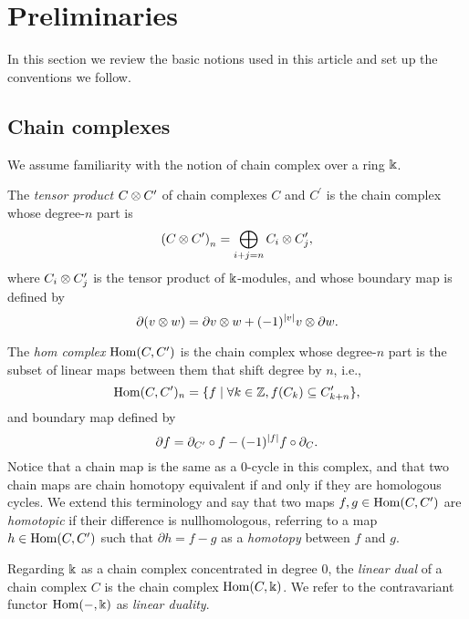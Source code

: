 
\section{Preliminaries} \label{s:preliminaries}

In this section we review the basic notions used in this article and set up the conventions we follow.

\subsection{Chain complexes}

We assume familiarity with the notion of chain complex over a ring $\Bbbk$.

The \textit{tensor product} $C \otimes C^\prime$ of chain complexes $C$ and $C^\prime$ is the chain complex whose degree-$n$ part is
\begin{equation*}
\left(C \otimes C^\prime\right)_n = \bigoplus_{i+j=n} C_i \otimes C^\prime_j,
\end{equation*}
where $C_i \otimes C^\prime_j$ is the tensor product of $\Bbbk$-modules, and whose boundary map is defined by
\begin{equation*}
\partial (v \otimes w) = \partial v \otimes w + (-1)^{|v|} v \otimes \partial w.
\end{equation*}

The \textit{hom complex} $\mathrm{Hom}(C, C^\prime)$ is the chain complex whose degree-$n$ part is the subset of linear maps between them that shift degree by $n$, i.e.,
\begin{equation*}
\mathrm{Hom}(C, C^\prime)_n = \{f \mid \forall k \in \mathbb{Z}, f(C_k) \subseteq C^\prime_{k+n}\},
\end{equation*}
and boundary map defined by
\begin{equation*}
\partial f =
\partial_{C^\prime} \circ f - (-1)^{\lvert f\rvert} f \circ \partial_C.
\end{equation*}
Notice that a chain map is the same as a $0$-cycle in this complex, and that two chain maps are chain homotopy equivalent if and only if they are homologous cycles.
We extend this terminology and say that two maps $f, g \in \mathrm{Hom}(C, C^\prime)$ are \textit{homotopic} if their difference is nullhomologous, referring to a map $h \in \mathrm{Hom}(C, C^\prime)$ such that $\partial h = f - g$ as a \textit{homotopy} between $f$ and $g$.

Regarding $\Bbbk$ as a chain complex concentrated in degree $0$, the \textit{linear dual} of a chain complex $C$ is the chain complex $\mathrm{Hom}(C, \Bbbk)$.
We refer to the contravariant functor $\mathrm{Hom}(-, \Bbbk)$ as \textit{linear duality}.

